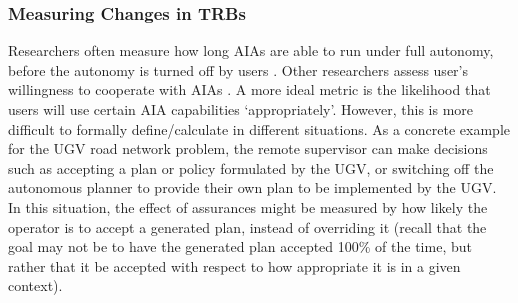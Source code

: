\subsubsection{Measuring Changes in TRBs} Researchers often measure how long AIAs are able to run under full autonomy, before the autonomy is turned off by users \cite{Freedy2007-sg,Desai2012-rc}. 
Other researchers assess user's willingness to cooperate with AIAs \cite{Salem2015-md,Wu2016-ei,Bainbridge2011-pl}. 
A more ideal metric is the likelihood that users will use certain AIA capabilities `appropriately'. 
However, this is more difficult to formally define/calculate in different situations. 
As a concrete example for the UGV road network problem, %
the remote supervisor can make decisions such as accepting a plan or policy formulated by the UGV, or switching off the autonomous planner to provide their own plan to be implemented by the UGV. 
In this situation, the effect of assurances might be measured by how likely the operator is to accept a generated plan, instead of overriding it (recall that the goal may not be to have the generated plan accepted 100\% of the time, but rather that it be accepted with respect to how appropriate it is in a given context).

